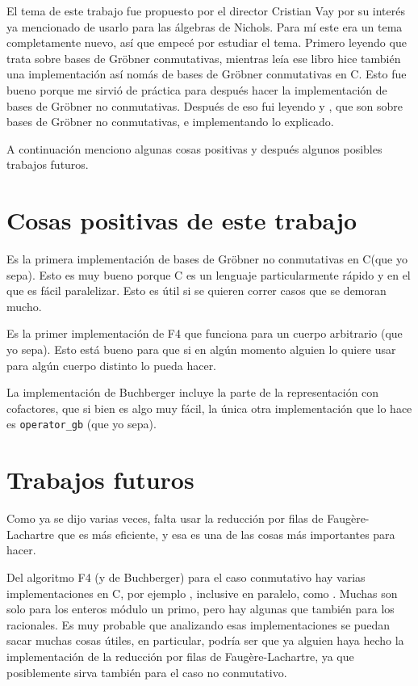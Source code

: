 \documentclass[12pt]{report}
\theoremstyle{customstyle}
\theoremstyle{factstyle}
\newcommand\cpp{C\nolinebreak[4]\hspace{-.05em}\raisebox{.4ex}{\relsize{-3}{\textbf{++}}}\xspace}
\begin{document}
El tema de este trabajo fue propuesto por el director Cristian Vay por su interés ya mencionado de usarlo para las álgebras de Nichols. Para mí este era un tema completamente nuevo, así que empecé por estudiar el tema. Primero leyendo \cite{book:ideals-varieties-algorithms} que trata sobre bases de Gröbner conmutativas, mientras leía ese libro hice también una implementación así nomás de bases de Gröbner conmutativas en \cpp. Esto fue bueno porque me sirvió de práctica para después hacer la implementación de bases de Gröbner no conmutativas. Después de eso fui leyendo \cite{thesis:Hof20} y \cite{phdthesis:Hof23}, que son sobre bases de Gröbner no conmutativas, e implementando lo explicado.

A continuación menciono algunas cosas positivas y después algunos posibles trabajos futuros.

\section{Cosas positivas de este trabajo}

Es la primera implementación de bases de Gröbner no conmutativas en \cpp (que yo sepa). Esto es muy bueno porque \cpp es un lenguaje particularmente rápido y en el que es fácil paralelizar. Esto es útil si se quieren correr casos que se demoran mucho.

Es la primer implementación de F4 que funciona para un cuerpo arbitrario (que yo sepa). Esto está bueno para que si en algún momento alguien lo quiere usar para algún cuerpo distinto lo pueda hacer.

La implementación de Buchberger incluye la parte de la representación con cofactores, que si bien es algo muy fácil, la única otra implementación que lo hace es \texttt{operator\_gb} (que yo sepa).

\section{Trabajos futuros}\label{section:trabajos futuros}

Como ya se dijo varias veces, falta usar la reducción por filas de Faugère-Lachartre que es más eficiente, y esa es una de las cosas más importantes para hacer.

Del algoritmo F4 (y de Buchberger) para el caso conmutativo hay varias implementaciones en \cpp, por ejemplo \cite{lib:openf4, lib:mathic, lib:M4GB}, inclusive en paralelo, como \cite{DBLP:journals/jsc/Reeves98, lib:parallelGBC}. Muchas son solo para los enteros módulo un primo, pero hay algunas que también para los racionales. Es muy probable que analizando esas implementaciones se puedan sacar muchas cosas útiles, en particular, podría ser que ya alguien haya hecho la implementación de la reducción por filas de Faugère-Lachartre, ya que posiblemente sirva también para el caso no conmutativo.
\end{document}
